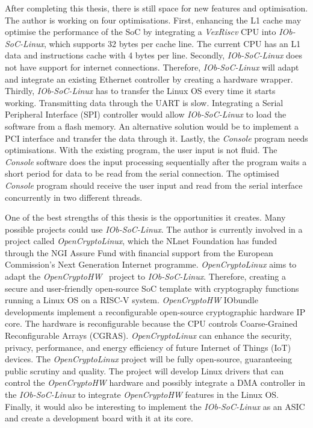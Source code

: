 After completing this thesis, there is still space for new features and optimisation. The author is working on four optimisations. First, enhancing the L1 cache may optimise the performance of the SoC by integrating a \textit{VexRiscv} CPU into \textit{IOb-SoC-Linux}, which supports 32 bytes per cache line. The current CPU has an L1 data and instructions cache with 4 bytes per line. Secondly, \textit{IOb-SoC-Linux} does not have support for internet connections. Therefore, \textit{IOb-SoC-Linux} will adapt and integrate an existing Ethernet controller by creating a hardware wrapper. Thirdly, \textit{IOb-SoC-Linux} has to transfer the Linux OS every time it starts working. Transmitting data through the UART is slow. Integrating a Serial Peripheral Interface (SPI) controller would allow \textit{IOb-SoC-Linux} to load the software from a flash memory. An alternative solution would be to implement a PCI interface and transfer the data through it. Lastly, the \textit{Console} program needs optimisations. With the existing program, the user input is not fluid. The \textit{Console} software does the input processing sequentially after the program waits a short period for data to be read from the serial connection. The optimised \textit{Console} program should receive the user input and read from the serial interface concurrently in two different threads.

One of the best strengths of this thesis is the opportunities it creates. Many possible projects could use \textit{IOb-SoC-Linux}. The author is currently involved in a project called \textit{OpenCryptoLinux}, which the NLnet Foundation has funded through the NGI Assure Fund with financial support from the European Commission's Next Generation Internet programme. \textit{OpenCryptoLinux} aims to adapt the \textit{OpenCryptoHW}~\cite{open_crypto_hw} project to \textit{IOb-SoC-Linux}. Therefore, creating a secure and user-friendly open-source SoC template with cryptography functions running a Linux OS on a RISC-V system. \textit{OpenCryptoHW} IObundle developments implement a reconfigurable open-source cryptographic hardware IP core. The hardware is reconfigurable because the CPU controls Coarse-Grained Reconfigurable Arrays (CGRAS). \textit{OpenCryptoLinux} can enhance the security, privacy, performance, and energy efficiency of future Internet of Things (IoT) devices. The \textit{OpenCryptoLinux} project will be fully open-source, guaranteeing public scrutiny and quality. The project will develop Linux drivers that can control the \textit{OpenCryptoHW} hardware and possibly integrate a DMA controller in the \textit{IOb-SoC-Linux} to integrate \textit{OpenCryptoHW} features in the Linux OS. Finally, it would also be interesting to implement the \textit{IOb-SoC-Linux} as an ASIC and create a development board with it at its core.
